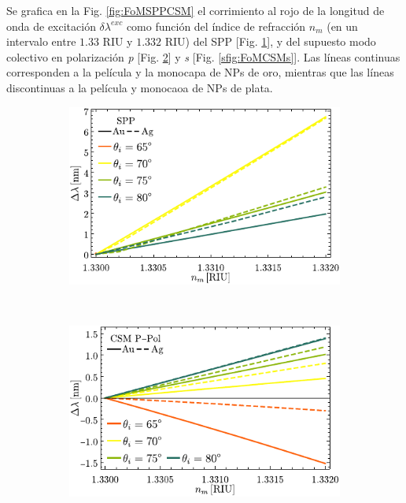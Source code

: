 Se grafica en la Fig. \ref{fig:FoMSPPCSM} el corrimiento al rojo de la longitud de onda de excitación $\delta\lambda^{exc}$ como función del índice de refracción $n_m$ (en un intervalo entre $1.33$ RIU y $1.332$ RIU)  del SPP [Fig. \ref{sfig:FoMSPP}], y del supuesto modo colectivo en polarización \emph{p} [Fig. \ref{sfig:FoMCSMp}] y \emph{s} [Fig. \ref{sfig:FoMCSMs}]. Las líneas continuas corresponden a la película y la monocapa de NPs de oro, mientras que las líneas discontinuas a la película y monocaoa de NPs de plata.

\begin{figure}[h!]\centering
\begin{subfigure}{.01\linewidth}\caption{}\label{sfig:FoMSPP}\vspace{4.5cm}\end{subfigure}
	\begin{subfigure}{.45\linewidth}\hspace*{-1.5em}
	\includegraphics[scale=1]{2-Resultados/figs/11-SPPCSM/4_Sens_h20-SPP.pdf}\end{subfigure}\\
\hspace*{-1.5em}
	\begin{subfigure}{.01\linewidth}\caption{}\label{sfig:FoMCSMp}\vspace{4.5cm}\end{subfigure}
	\begin{subfigure}{.45\linewidth}\hspace*{-1.5em}
	\includegraphics[scale=1]{2-Resultados/figs/11-SPPCSM/5_Sens_h20_CSMP.pdf}\end{subfigure}

\end{figure}
